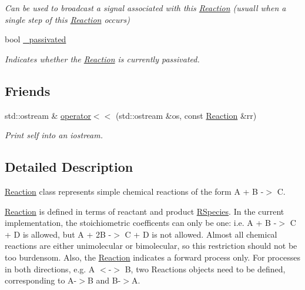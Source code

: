 \begin{DoxyCompactItemize}
\begin{DoxyCompactList}\small\item\em Can be used to broadcast a signal associated with this \hyperlink{classchem_1_1Reaction}{Reaction} (usuall when a single step of this \hyperlink{classchem_1_1Reaction}{Reaction} occurs) \end{DoxyCompactList}\item 
bool \hyperlink{classchem_1_1Reaction_aa0151836a315ac001ef94277b126c329}{\-\_\-passivated}
\begin{DoxyCompactList}\small\item\em Indicates whether the \hyperlink{classchem_1_1Reaction}{Reaction} is currently passivated. \end{DoxyCompactList}\end{DoxyCompactItemize}
\subsection*{Friends}
\begin{DoxyCompactItemize}
\item 
std\-::ostream \& \hyperlink{classchem_1_1Reaction_adae3b3c285aa2beddbb06bab27f9398f}{operator$<$$<$} (std\-::ostream \&os, const \hyperlink{classchem_1_1Reaction}{Reaction} \&rr)
\begin{DoxyCompactList}\small\item\em Print self into an iostream. \end{DoxyCompactList}\end{DoxyCompactItemize}


\subsection{Detailed Description}
\hyperlink{classchem_1_1Reaction}{Reaction} class represents simple chemical reactions of the form A + B -\/$>$ C. 

\hyperlink{classchem_1_1Reaction}{Reaction} is defined in terms of reactant and product \hyperlink{classchem_1_1RSpecies}{R\-Species}. In the current implementation, the stoichiometric coefficents can only be one\-: i.\-e. A + B -\/$>$ C + D is allowed, but A + 2\-B -\/$>$ C + D is not allowed. Almost all chemical reactions are either unimolecular or bimolecular, so this restriction should not be too burdensom. Also, the \hyperlink{classchem_1_1Reaction}{Reaction} indicates a forward process only. For processes in both directions, e.\-g. A $<$-\/$>$ B, two Reactions objects need to be defined, corresponding to A-\/$>$B and B-\/$>$A.

